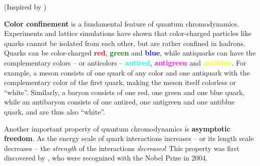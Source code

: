 (Inspired by \cite{ref:quark_bag_model})


\begin{figure}
\centering
{}
\caption{\label{fig:lsm:confinement}%
}
\end{figure}

\textbf{Color confinement} is a fundamental feature of quantum chromodynamics.
Experiments and lattice simulations have shown that color-charged particles like quarks cannot be isolated from each other, but are rather confined in hadrons.
Quarks can be color-charged \textcolor{red}{\textbf{red}}, \textcolor{green}{\textbf{green}} and \textcolor{blue}{\textbf{blue}},
while antiquarks can have the complementary colors -- or anticolors -- \textcolor{cyan}{\textbf{antired}}, \textcolor{magenta}{\textbf{antigreen}} and \textcolor{yellow}{\textbf{antiblue}}.
For example, a meson consists of one quark of any color and one antiquark with the complementary color of the first quark, making the meson itself colorless or ``white''.
Similarly, a baryon consists of one red, one green and one blue quark,
while an antibaryon consists of one antired, one antigreen and one antiblue quark,
and are thus also ``white''.

Another important property of quantum chromodynamics is \textbf{asymptotic freedom}.
As the energy scale of quark interactions increases -- or its length scale decreases -- the \emph{strength} of the interactions \emph{decreases}!
This property was first discovered by \cite{ref:asymptotic_freedom_gross_wilczek,ref:asymptotic_freedom_politzer}, who were recognized with the Nobel Prize in 2004.

